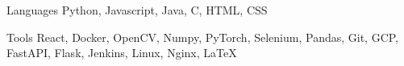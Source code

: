 

\begin{cvskills}

  \cvskill
    {Languages} %
    {Python, Javascript, Java, C, HTML, CSS} %

  \cvskill
    {Tools} %
    {React, Docker, OpenCV, Numpy, PyTorch, Selenium, Pandas, Git, GCP, FastAPI, Flask, Jenkins, Linux, Nginx, LaTeX} %

\end{cvskills}

